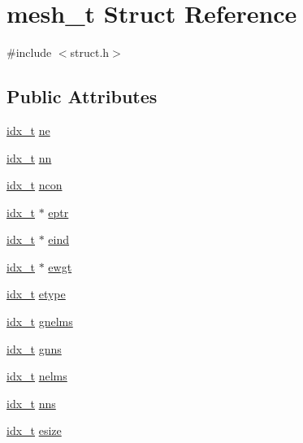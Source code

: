 \hypertarget{a00738}{}\section{mesh\+\_\+t Struct Reference}
\label{a00738}


{\ttfamily \#include $<$struct.\+h$>$}

\subsection*{Public Attributes}
\begin{DoxyCompactItemize}
\item 
\hyperlink{a00876_aaa5262be3e700770163401acb0150f52}{idx\+\_\+t} \hyperlink{a00738_ac33c0c0c59858834a11754492189e231}{ne}
\item 
\hyperlink{a00876_aaa5262be3e700770163401acb0150f52}{idx\+\_\+t} \hyperlink{a00738_a6321957b37b2040997c84db2fd2b8427}{nn}
\item 
\hyperlink{a00876_aaa5262be3e700770163401acb0150f52}{idx\+\_\+t} \hyperlink{a00738_ad18b1da90165616c622c16ce79c6907f}{ncon}
\item 
\hyperlink{a00876_aaa5262be3e700770163401acb0150f52}{idx\+\_\+t} $\ast$ \hyperlink{a00738_abe330de09173a4faac6dbf76f1ae90f8}{eptr}
\item 
\hyperlink{a00876_aaa5262be3e700770163401acb0150f52}{idx\+\_\+t} $\ast$ \hyperlink{a00738_aea23f507e73665abf78ffc3ecc540210}{eind}
\item 
\hyperlink{a00876_aaa5262be3e700770163401acb0150f52}{idx\+\_\+t} $\ast$ \hyperlink{a00738_a0a2369b26fbcc6229681ec8cb9e8f713}{ewgt}
\item 
\hyperlink{a00876_aaa5262be3e700770163401acb0150f52}{idx\+\_\+t} \hyperlink{a00738_a6310e3f72d750dd2f477dc6bbc3d6c1c}{etype}
\item 
\hyperlink{a00876_aaa5262be3e700770163401acb0150f52}{idx\+\_\+t} \hyperlink{a00738_ad2a13c39ecaddc9add6afe612f05bea4}{gnelms}
\item 
\hyperlink{a00876_aaa5262be3e700770163401acb0150f52}{idx\+\_\+t} \hyperlink{a00738_ad534138460141cd611dc0fae1baf8346}{gnns}
\item 
\hyperlink{a00876_aaa5262be3e700770163401acb0150f52}{idx\+\_\+t} \hyperlink{a00738_ad2c11f70ee4b511bd158dbd38f46fc14}{nelms}
\item 
\hyperlink{a00876_aaa5262be3e700770163401acb0150f52}{idx\+\_\+t} \hyperlink{a00738_abf9cfafc4af9ca5ac76785bc2c849780}{nns}
\item 
\hyperlink{a00876_aaa5262be3e700770163401acb0150f52}{idx\+\_\+t} \hyperlink{a00738_abec9334407d17d3f681fe82e5f0ae157}{esize}

\end{DoxyCompactItemize}
